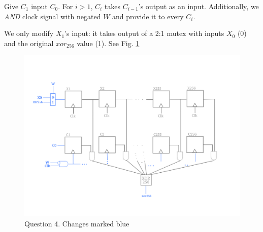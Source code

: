 Give $C_1$ input $C_0$. 
For $i>1$, $C_i$ takes $C_{i-1}$'s output as an input.
Additionally, we \emph{AND} clock signal with negated $W$ and provide it to every $C_i$.

We only modify $X_1$'s input: it takes output of a 2:1 mutex with inputs $X_0$ (0) and the original $xor_{256}$ value (1).
See Fig. \ref{fig:w17-4-4}
\begin{figure}[!h]
    \centering
    \includegraphics[scale=0.25]{data/2017-W-4-4.png}
    \caption{Question 4. Changes marked blue}
    \label{fig:w17-4-4}
\end{figure}


